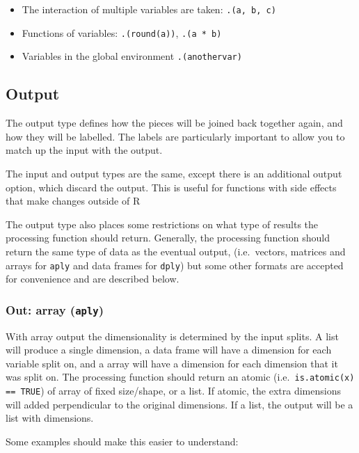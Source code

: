 \documentclass[letterpaper,oneside]{scrartcl}
\begin{document}
\begin{itemize}
  \item The interaction of multiple variables are taken: {\tt .(a, b, c)}
  \item Functions of variables: {\tt .(round(a))}, {\tt .(a * b)}
  \item Variables in the global environment {\tt .(anothervar)}
\end{itemize}

\subsection{Output}
\label{sec:output}

The output type defines how the pieces will be joined back together again, and how they will be labelled.  The labels are particularly important to allow you to match up the input with the output.

The input and output types are the same, except there is an additional output option, which discard the output.  This is useful for functions with side effects that make changes outside of R

The output type also places some restrictions on what type of results the processing function should return.  Generally, the processing function should return the same type of data as the eventual output, (i.e.\ vectors, matrices and arrays for {\tt *aply} and data frames for {\tt *dply}) but some other formats are accepted for convenience and are described below.  


\subsubsection{Out: array ({\tt *aply})}

With array output the dimensionality is determined by the input splits.  A list will produce a single dimension, a data frame will have a dimension for each variable split on, and a array will have a dimension for each dimension that it was split on.  The processing function should return an atomic (i.e.\ {\tt is.atomic(x) == TRUE}) of array of fixed size/shape, or a list.  If atomic, the extra dimensions will added perpendicular to the original dimensions.  If a list, the output will be a list with dimensions.  

Some examples should make this easier to understand:
\end{document}
